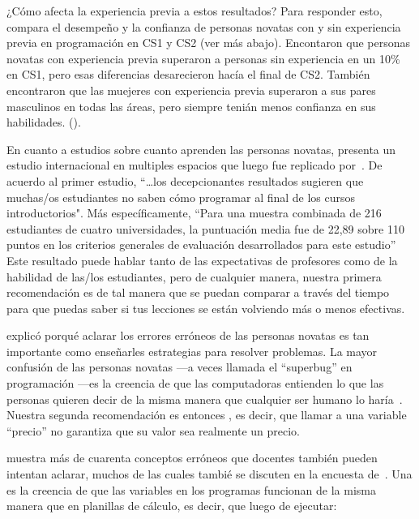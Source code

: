 ¿Cómo afecta la experiencia previa a estos resultados?
Para responder esto, 
\cite{Wilc2018} compara el desempeño y la confianza de personas novatas
con y sin experiencia previa en programación en CS1 y CS2 (ver más abajo).
Encontaron que personas novatas con experiencia previa superaron a personas sin experiencia en un 10\% en CS1,
pero esas diferencias desarecieron hacía el final de CS2.
También encontraron que las muejeres con experiencia previa superaron a sus pares masculinos en todas las áreas,
pero siempre tenián menos confianza en sus habilidades. ().

En cuanto a estudios sobre cuanto aprenden las personas novatas,
\cite{McCr2001} presenta un estudio internacional en multiples espacios que luego fue replicado por~\cite{Utti2013}.
De acuerdo al primer estudio,
``{\ldots}los decepcionantes resultados sugieren que
muchas/os estudiantes no saben cómo programar al final de los cursos introductorios".
Más específicamente,
``Para una muestra combinada de 216 estudiantes de cuatro universidades,
la puntuación media fue de 22,89 sobre 110 puntos en los criterios generales de evaluación desarrollados para este estudio''
Este resultado puede hablar tanto de las expectativas de profesores como de la habilidad de las/los estudiantes,
pero de cualquier manera,
nuestra primera recomendación es 
de tal manera que se puedan comparar a través del tiempo para que puedas saber si tus lecciones se están volviendo más o menos efectivas.


 explicó porqué aclarar los errores erróneos de las personas novatas es tan importante como enseñarles
estrategias para resolver problemas.
La mayor confusión de las personas novatas ---a veces llamada el ``superbug'' en programación ---es
la creencia de que las computadoras entienden lo que las personas quieren decir de la misma manera que cualquier ser humano lo haría~\cite{Pea1986}.
Nuestra segunda recomendación es entonces ,
es decir, que llamar a una variable ``precio'' no garantiza que su valor sea realmente un precio.

\cite{Sorv2018}  muestra más de cuarenta conceptos erróneos que docentes también pueden intentan aclarar,
muchos de las cuales tambié se discuten en la encuesta de~\cite{Qian2017}.
Una es la creencia de que las variables en los programas funcionan de la misma manera que en planillas de cálculo,
es decir, que luego de ejecutar:

